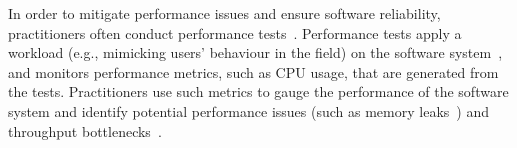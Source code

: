 


In order to mitigate performance issues and ensure software reliability, practitioners often conduct performance tests~\cite{futureofspe}. Performance tests apply a workload (e.g., mimicking users' behaviour in the field) on the software system~\cite{ranjanbook,Syer2016}, and monitors performance metrics, such as CPU usage, that are generated from the tests. Practitioners use such metrics to gauge the performance of the software system and identify potential performance issues (such as memory leaks~\cite{markicsm2013}) and throughput bottlenecks~\cite{5635038}.



